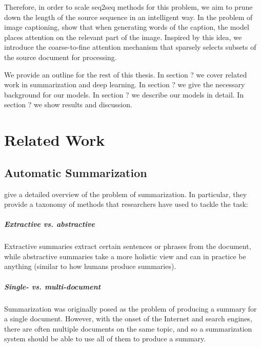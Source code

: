 \documentclass[11pt]{report}
\begin{document}
Therefore, in order to scale seq2seq methods for this problem, we aim to prune down the length of the source sequence in an intelligent way. In the problem of image captioning, \citet{xu2015captioning} show that when generating words of the caption, the model places attention on the relevant part of the image.
Inspired by this idea, we introduce the coarse-to-fine attention mechanism that sparsely selects subsets of the source document for processing.


We provide an outline for the rest of this thesis.
In section ? we cover related work in summarization and deep learning.
In section ? we give the necessary background for our models.
In section ? we describe our models in detail.
In section ? we show results and discussion.


\chapter{Related Work}

\section{Automatic Summarization}

\citet{Nenkova2011} give a detailed overview of the problem of summarization. In particular, they provide a taxonomy of methods that researchers have used to tackle the task:

\paragraph{Extractive vs. abstractive} Extractive summaries extract certain sentences or phrases from the document, while abstractive summaries take a more holistic view and can in practice be anything (similar to how humans produce summaries). 

\paragraph{Single- vs. multi-document} Summarization was originally posed as the problem of producing a summary for a single document. However, with the onset of the Internet and search engines, there are often multiple documents on the same topic, and so a summarization system should be able to use all of them to produce a summary.

\end{document}
